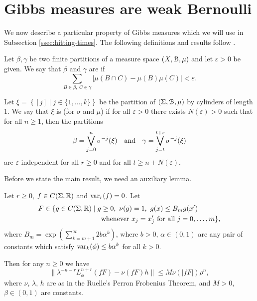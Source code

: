 \section{Gibbs measures are weak Bernoulli}
We now describe a particular property of Gibbs measures which we will use in Subsection \ref{ssec:hitting-times}. The following definitions and results follow \cite[Section 1.E]{bowen:equilibrium}.

\begin{definition}
	Let $\beta, \gamma$ be two finite partitions of a measure space $(X, \mathcal{B}, \mu)$ and let $\varepsilon > 0$ be given. We say that $\beta$ and $\gamma$ are  if
	\[
		\sum_{B \in \beta,\ C \in \gamma}{|\mu(B \cap C) - \mu(B)\mu(C)|} < \varepsilon.
	\]
\end{definition}

\begin{definition}
	Let $\xi = \left\{[j] \mid j \in \{1, \dots, k\}\right\}$ be the partition of $(\Sigma, \mathcal{B}, \mu)$ by cylinders of length 1. We say that $\xi$ is  (for $\sigma$ and $\mu$) if for all $\varepsilon > 0$ there exists $N(\varepsilon) > 0$ such that for all $n \geq 1$, then the partitions
	\[
		\beta = \bigvee_{j = 0}^n{\sigma^{-j}(\xi)} \quad \text{and} \quad \gamma = \bigvee_{j = t}^{t + r}{\sigma^{-j}(\xi)}
	\]
	are $\varepsilon$-independent for all $r \geq 0$ and for all $t \geq n + N(\varepsilon)$.
\end{definition}

Before we state the main result, we need an auxiliary lemma.

\begin{lemma}\label{bowen:lem-1-12}
	Let $r \geq 0$, $f \in C(\Sigma, \mathbb{R})$ and $\operatorname{var}_r(f) = 0$. Let
	\begin{align*}
		F \in \{g \in C(\Sigma, \mathbb{R}) \mid g & \geq 0,\ \nu(g) = 1,\ g(x) \leq B_m g(x') \\
			& \text{whenever } x_j = x'_j \text{ for all } j = 0, \dots, m\},
	\end{align*}
	where $B_m = \exp\left(\sum_{k = m + 1}^\infty{2b\alpha^k}\right)$, where $b > 0$, $\alpha \in (0, 1)$ are any pair of constants which satisfy $\operatorname{var}_k(\phi) \leq b\alpha^k$ for all $k > 0$.
	
	Then for any $n \geq 0$ we have
	\[
		\|\lambda^{-n - r}L_\phi^{n + r}(fF) - \nu(fF)h\| \leq M\nu(|fF|)\rho^n,
	\]
	where $\nu$, $\lambda$, $h$ are as in the Ruelle's Perron Frobenius Theorem, and $M > 0$, $\beta \in (0, 1)$ are constants.
\end{lemma}

